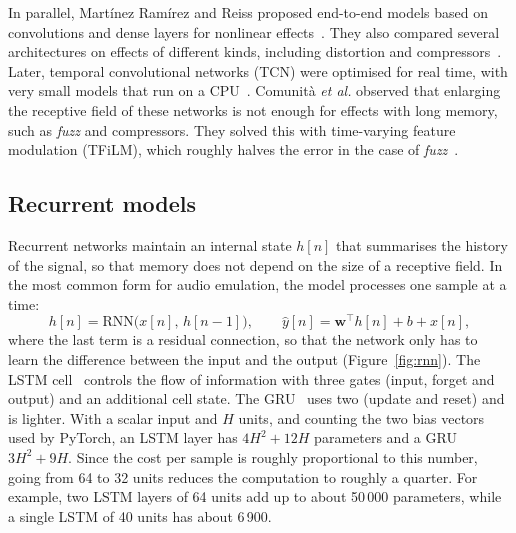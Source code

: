 \documentclass[ENG]{TFUOC}%
\begin{document}
In parallel, Martínez Ramírez and Reiss proposed end-to-end models based on convolutions and dense layers for nonlinear effects~\cite{martinez2019}. They also compared several architectures on effects of different kinds, including distortion and compressors~\cite{martinez2020}. Later, temporal convolutional networks (TCN) were optimised for real time, with very small models that run on a CPU~\cite{steinmetz2022}. Comunità \emph{et al.} observed that enlarging the receptive field of these networks is not enough for effects with long memory, such as \emph{fuzz} and compressors. They solved this with time-varying feature modulation (TFiLM), which roughly halves the error in the case of \emph{fuzz}~\cite{comunita2023}.

\subsection{Recurrent models}

Recurrent networks maintain an internal state $h[n]$ that summarises the history of the signal, so that memory does not depend on the size of a receptive field. In the most common form for audio emulation, the model processes one sample at a time:
\begin{equation}
h[n] = \mathrm{RNN}\big(x[n],\, h[n-1]\big), \qquad \hat{y}[n] = \mathbf{w}^{\top} h[n] + b + x[n],
\end{equation}
where the last term is a residual connection, so that the network only has to learn the difference between the input and the output (Figure~\ref{fig:rnn}). The LSTM cell~\cite{hochreiter1997} controls the flow of information with three gates (input, forget and output) and an additional cell state. The GRU~\cite{cho2014} uses two (update and reset) and is lighter. With a scalar input and $H$ units, and counting the two bias vectors used by PyTorch, an LSTM layer has $4H^2+12H$ parameters and a GRU $3H^2+9H$. Since the cost per sample is roughly proportional to this number, going from 64 to 32 units reduces the computation to roughly a quarter. For example, two LSTM layers of 64 units add up to about 50\,000 parameters, while a single LSTM of 40 units has about 6\,900.
\end{document}
